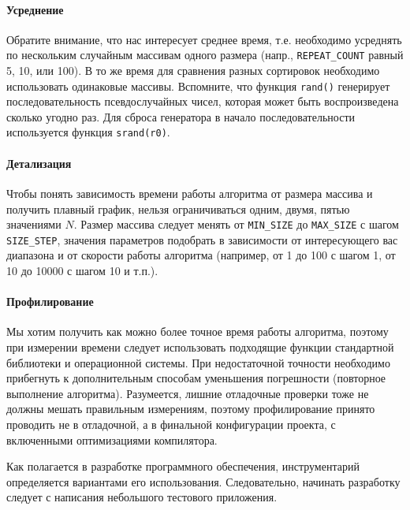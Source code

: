 \paragraph{Усреднение}
Обратите внимание, что нас интересует среднее время, т.е. необходимо усреднять по нескольким
случайным массивам одного размера (напр., \texttt{REPEAT\_COUNT} равный 5, 10, или 100). В то же
время для сравнения разных сортировок необходимо использовать одинаковые массивы. Вспомните, что
функция \texttt{rand()} генерирует последовательность псевдослучайных чисел, которая может быть
воспроизведена сколько угодно раз. Для сброса генератора в начало последовательности используется
функция \texttt{srand(r0)}.

\paragraph{Детализация}
Чтобы понять зависимость времени работы алгоритма от размера массива и получить плавный график,
нельзя ограничиваться одним, двумя, пятью значениями $N$. Размер массива следует менять от
\texttt{MIN\_SIZE} до \texttt{MAX\_SIZE} с шагом \texttt{SIZE\_STEP}, значения параметров подобрать
в зависимости от интересующего вас диапазона и от скорости работы алгоритма (например, от 1 до 100
с шагом 1, от 10 до 10000 с шагом 10 и т.п.).

\paragraph{Профилирование}
Мы хотим получить как можно более точное время работы алгоритма, поэтому при измерении времени
следует использовать подходящие функции стандартной библиотеки и операционной системы. При
недостаточной точности необходимо прибегнуть к дополнительным способам уменьшения погрешности
(повторное выполнение алгоритма). Разумеется, лишние отладочные проверки тоже не должны мешать
правильным измерениям, поэтому профилирование принято проводить не в отладочной, а в финальной
конфигурации проекта, с включенными оптимизациями компилятора.


\zzsectionPLAN


Как полагается в разработке программного обеспечения, инструментарий определяется вариантами его
использования. Следовательно, начинать разработку следует с написания небольшого тестового
приложения.

